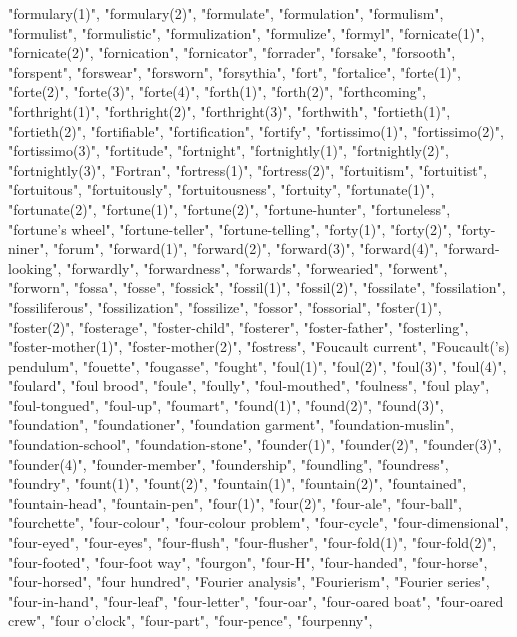"formulary(1)",
"formulary(2)",
"formulate",
"formulation",
"formulism",
"formulist",
"formulistic",
"formulization",
"formulize",
"formyl",
"fornicate(1)",
"fornicate(2)",
"fornication",
"fornicator",
"forrader",
"forsake",
"forsooth",
"forspent",
"forswear",
"forsworn",
"forsythia",
"fort",
"fortalice",
"forte(1)",
"forte(2)",
"forte(3)",
"forte(4)",
"forth(1)",
"forth(2)",
"forthcoming",
"forthright(1)",
"forthright(2)",
"forthright(3)",
"forthwith",
"fortieth(1)",
"fortieth(2)",
"fortifiable",
"fortification",
"fortify",
"fortissimo(1)",
"fortissimo(2)",
"fortissimo(3)",
"fortitude",
"fortnight",
"fortnightly(1)",
"fortnightly(2)",
"fortnightly(3)",
"Fortran",
"fortress(1)",
"fortress(2)",
"fortuitism",
"fortuitist",
"fortuitous",
"fortuitously",
"fortuitousness",
"fortuity",
"fortunate(1)",
"fortunate(2)",
"fortune(1)",
"fortune(2)",
"fortune-hunter",
"fortuneless",
"fortune's wheel",
"fortune-teller",
"fortune-telling",
"forty(1)",
"forty(2)",
"forty-niner",
"forum",
"forward(1)",
"forward(2)",
"forward(3)",
"forward(4)",
"forward-looking",
"forwardly",
"forwardness",
"forwards",
"forwearied",
"forwent",
"forworn",
"fossa",
"fosse",
"fossick",
"fossil(1)",
"fossil(2)",
"fossilate",
"fossilation",
"fossiliferous",
"fossilization",
"fossilize",
"fossor",
"fossorial",
"foster(1)",
"foster(2)",
"fosterage",
"foster-child",
"fosterer",
"foster-father",
"fosterling",
"foster-mother(1)",
"foster-mother(2)",
"fostress",
"Foucault current",
"Foucault('s) pendulum",
"fouette",
"fougasse",
"fought",
"foul(1)",
"foul(2)",
"foul(3)",
"foul(4)",
"foulard",
"foul brood",
"foule",
"foully",
"foul-mouthed",
"foulness",
"foul play",
"foul-tongued",
"foul-up",
"foumart",
"found(1)",
"found(2)",
"found(3)",
"foundation",
"foundationer",
"foundation garment",
"foundation-muslin",
"foundation-school",
"foundation-stone",
"founder(1)",
"founder(2)",
"founder(3)",
"founder(4)",
"founder-member",
"foundership",
"foundling",
"foundress",
"foundry",
"fount(1)",
"fount(2)",
"fountain(1)",
"fountain(2)",
"fountained",
"fountain-head",
"fountain-pen",
"four(1)",
"four(2)",
"four-ale",
"four-ball",
"fourchette",
"four-colour",
"four-colour problem",
"four-cycle",
"four-dimensional",
"four-eyed",
"four-eyes",
"four-flush",
"four-flusher",
"four-fold(1)",
"four-fold(2)",
"four-footed",
"four-foot way",
"fourgon",
"four-H",
"four-handed",
"four-horse",
"four-horsed",
"four hundred",
"Fourier analysis",
"Fourierism",
"Fourier series",
"four-in-hand",
"four-leaf",
"four-letter",
"four-oar",
"four-oared boat",
"four-oared crew",
"four o'clock",
"four-part",
"four-pence",
"fourpenny",
